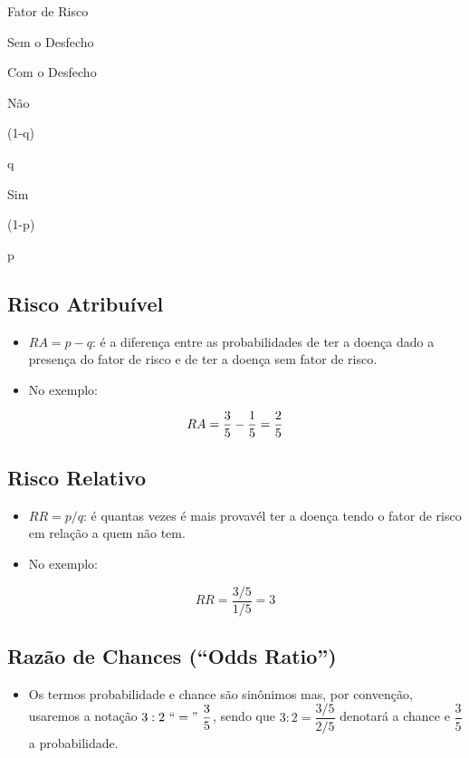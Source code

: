 \documentclass[
]{book}
\providecommand{\tightlist}{%
  \setlength{\itemsep}{0pt}\setlength{\parskip}{0pt}}
\begin{document}
Fator de Risco

Sem o Desfecho

Com o Desfecho

Não

(1-q)

q

Sim

(1-p)

p

\subsection{Risco Atribuível}\label{risco-atribuuxedvel}

\begin{itemize}
\tightlist
\item
  \(RA = p - q\): é a diferença entre as probabilidades de ter a doença dado a presença do fator de risco e de ter a doença sem fator de risco.\\
\item
  No exemplo:
\end{itemize}

\[RA =    \frac{3}{5} - {1 \over 5} = \frac{2}{5}\]

\subsection{Risco Relativo}\label{risco-relativo}

\begin{itemize}
\tightlist
\item
  \(RR = p/q\): é quantas vezes é mais provavél ter a doença tendo o fator de risco em relação a quem não tem.\\
\item
  No exemplo:
\end{itemize}

\[RR = \frac{3/5}{1/5} = 3  \]

\subsection{Razão de Chances (``Odds Ratio'')}\label{razuxe3o-de-chances-odds-ratio}

\begin{itemize}
\tightlist
\item
  Os termos probabilidade e chance são sinônimos mas, por convenção, usaremos a notação \(3:2  ~``="~ \dfrac{3}{5}\), sendo que \(3:2 = \dfrac{3/5}{2/5}\) denotará a chance e \(\dfrac{3}{5}\) a probabilidade.
\end{itemize}
\end{document}
